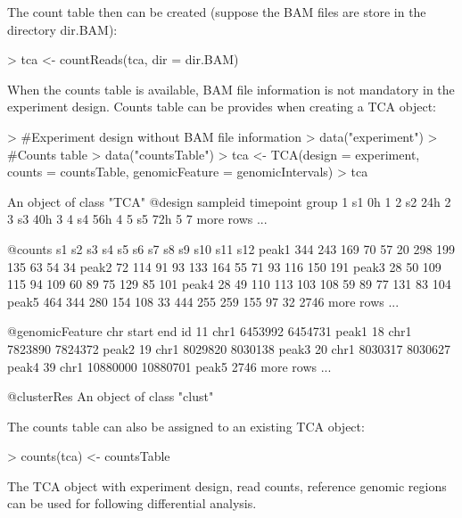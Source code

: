 \documentclass[a4paper]{article}
\begin{document}
The count table then can be created (suppose the BAM files are store in the directory dir.BAM):
\begin{Schunk}
\begin{Sinput}
> tca <- countReads(tca, dir = dir.BAM)
\end{Sinput}
\end{Schunk}
When the counts table is available, BAM file information is not mandatory in the experiment design. Counts table can be provides when creating a TCA object:
\begin{Schunk}
\begin{Sinput}
> #Experiment design without BAM file information
> data("experiment")
> #Counts table
> data("countsTable")
> tca <- TCA(design = experiment, counts = countsTable, genomicFeature = genomicIntervals)
> tca
\end{Sinput}
\begin{Soutput}
An object of class "TCA"
@design
  sampleid timepoint group
1       s1        0h     1
2       s2       24h     2
3       s3       40h     3
4       s4       56h     4
5       s5       72h     5
7 more rows ...

@counts
       s1  s2  s3  s4  s5  s6  s7  s8  s9 s10 s11 s12
peak1 344 243 169  70  57  20 298 199 135  63  54  34
peak2  72 114  91  93 133 164  55  71  93 116 150 191
peak3  28  50 109 115  94 109  60  89  75 129  85 101
peak4  28  49 110 113 103 108  59  89  77 131  83 104
peak5 464 344 280 154 108  33 444 255 259 155  97  32
2746 more rows ...

@genomicFeature
    chr    start      end    id
11 chr1  6453992  6454731 peak1
18 chr1  7823890  7824372 peak2
19 chr1  8029820  8030138 peak3
20 chr1  8030317  8030627 peak4
39 chr1 10880000 10880701 peak5
2746 more rows ...

@clusterRes
An object of class "clust"
\end{Soutput}
\end{Schunk}
The counts table can also be assigned to an existing TCA object:
\begin{Schunk}
\begin{Sinput}
> counts(tca) <- countsTable
\end{Sinput}
\end{Schunk}
The TCA object with experiment design, read counts, reference genomic regions can be used for following differential analysis.
\end{document}
